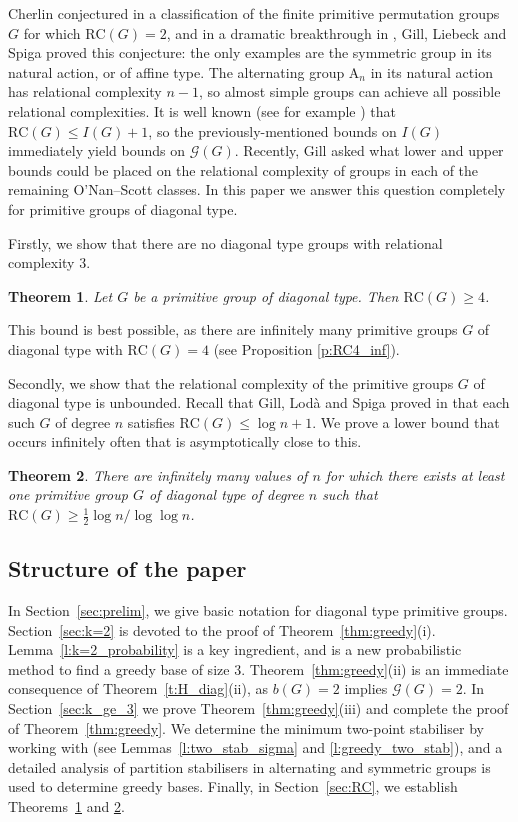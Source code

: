 \documentclass[twoside,a4paper,reqno,11pt]{amsart}
\newcommand{\RC}{\mathrm{RC}}
\newcommand{\<}{\langle}
\renewcommand{\>}{\rangle}
\newcommand{\leqs}{\leqslant}
\newcommand{\geqs}{\geqslant}
\newcommand{\An}{\mathrm{A}}
\newtheorem{theorem}{Theorem}
\theoremstyle{definition}
\begin{document}
Cherlin conjectured in \cite{CherlinGelfand} a classification of the finite primitive permutation groups $G$ for which $\RC(G) = 2$, and in a dramatic breakthrough in \cite{GLS_binary}, Gill, Liebeck and Spiga proved this conjecture: the only examples are the symmetric group in its natural action,  or of affine type. The alternating group $\An_n$ in its natural action has relational complexity $n - 1$, so almost simple groups can achieve all possible relational complexities. It is well known (see for example \cite[(1.1) and (1.2)]{GillLodaSpiga}) that $\RC(G) \leqs I(G)+1$, so the previously-mentioned bounds on $I(G)$ immediately yield bounds on $\mathcal{G}(G)$.  Recently, Gill asked what lower and upper bounds could be placed on the relational complexity of groups in each of the remaining O'Nan--Scott classes. In this paper we answer this question completely for primitive groups of diagonal type. 

Firstly, we show that there are no diagonal type groups with relational complexity $3$. 
\begin{theorem}\label{thm:RC4}
    Let $G$ be a primitive group of diagonal type. Then $\mathrm{RC}(G) \geqs 4$.
\end{theorem}
This bound is best possible, as there are infinitely many primitive groups $G$ of diagonal type with $\RC(G) = 4$ (see Proposition \ref{p:RC4_inf}).

Secondly, we show that the relational complexity of the primitive groups $G$ of diagonal type is unbounded. Recall that Gill, Lod\`a and Spiga proved in \cite{GillLodaSpiga} that each such $G$ of degree $n$ satisfies $\RC(G) \leqs \log n + 1$. We prove a lower bound that occurs infinitely often that is asymptotically close to this.

\begin{theorem}\label{thm:RClog}
There are infinitely many values of $n$ for which there exists at least one primitive group $G$ of diagonal type of degree $n$ such that $\RC(G) \geqs \frac{1}{2} \log n/\log \log n$.
\end{theorem}


\subsection*{Structure of the paper}

In Section~\ref{sec:prelim}, we give basic notation for diagonal type primitive groups. Section~\ref{sec:k=2} is devoted to the proof of Theorem~\ref{thm:greedy}(i). Lemma~\ref{l:k=2_probability} is a key ingredient, and is a new probabilistic method to find a greedy base of size $3$.  Theorem~\ref{thm:greedy}(ii) is an immediate consequence of Theorem~\ref{t:H_diag}(ii), as $b(G) = 2$ implies $\mathcal{G}(G) = 2$. In Section~\ref{sec:k_ge_3} we prove Theorem~\ref{thm:greedy}(iii) and complete the proof of Theorem~\ref{thm:greedy}. We determine the minimum two-point stabiliser by working with \cite[Theorem 4]{H_diag} (see Lemmas~\ref{l:two_stab_sigma} and \ref{l:greedy_two_stab}), and a detailed analysis of partition stabilisers in alternating and symmetric groups is used to determine greedy bases. Finally, in Section~\ref{sec:RC}, we establish Theorems~\ref{thm:RC4} and \ref{thm:RClog}.
\end{document}
